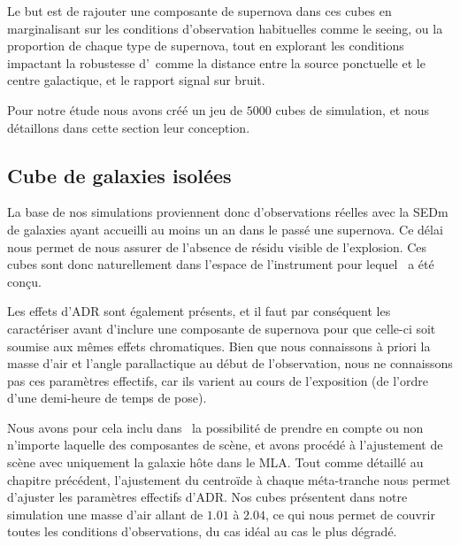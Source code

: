 \documentclass[../main/main.tex]{subfiles}
\begin{document}
Le but est de rajouter une composante de supernova dans ces
cubes en marginalisant sur les conditions d'observation habituelles
comme le seeing, ou la proportion de chaque type de supernova, tout en explorant
les conditions impactant la robustesse d'\hypergal\ comme la distance
entre la source ponctuelle et le centre galactique, et le rapport signal
sur bruit.

Pour notre étude nous avons créé un jeu de $5000$ cubes de simulation,
et nous  détaillons dans cette section leur conception.

\subsection{Cube de galaxies isolées}

La base de nos simulations proviennent donc d'observations réelles avec
la SEDm de galaxies ayant accueilli au moins un an dans le passé une
supernova. Ce délai nous permet de nous assurer de l'absence de résidu
visible de l'explosion.
Ces cubes sont donc naturellement dans l'espace de l'instrument pour
lequel \hypergal\ a été conçu.

Les effets d'ADR sont également présents, et il faut par conséquent les
caractériser avant d'inclure une composante de supernova pour que
celle-ci soit soumise aux mêmes effets chromatiques. 
Bien que nous connaissons à priori la masse d'air et l'angle
parallactique au début de l'observation, nous ne connaissons pas ces
paramètres effectifs, car ils varient au cours de l'exposition
(de l'ordre d'une demi-heure de temps de pose).

Nous avons pour cela inclu dans \hypergal\ la possibilité de prendre en
compte ou non n'importe laquelle des composantes de scène, et avons
procédé à l'ajustement de scène avec uniquement la galaxie hôte dans le
MLA. Tout comme détaillé au chapitre précédent, l'ajustement du
centroïde à chaque méta-tranche nous permet d'ajuster les paramètres
effectifs d'ADR. Nos cubes présentent dans notre simulation une masse
d'air allant de $1.01$ à $2.04$, ce qui nous permet de couvrir toutes les
conditions d'observations, du cas idéal au cas le plus dégradé.
\end{document}
